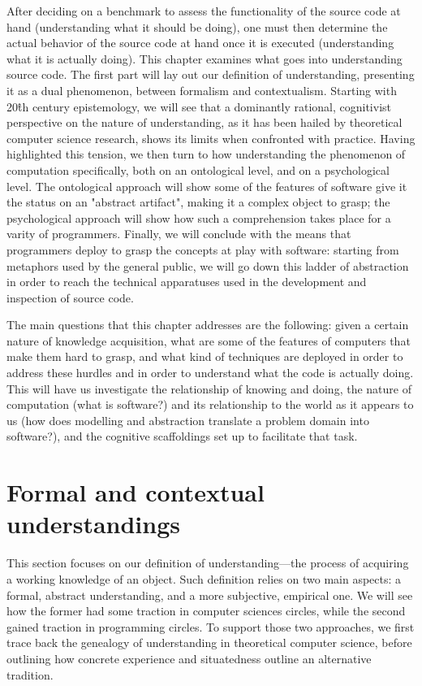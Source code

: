 After deciding on a benchmark to assess the functionality of the source code at hand (understanding what it should be doing), one must then determine the actual behavior of the source code at hand once it is executed (understanding what it is actually doing). This chapter examines what goes into understanding source code. The first part will lay out our definition of understanding, presenting it as a dual phenomenon, between formalism and contextualism. Starting with 20\^{th} century epistemology, we will see that a dominantly rational, cognitivist perspective on the nature of understanding, as it has been hailed by theoretical computer science research, shows its limits when confronted with practice. Having highlighted this tension, we then turn to how understanding the phenomenon of computation specifically, both on an ontological level, and on a psychological level. The ontological approach will show some of the features of software give it the status on an "abstract artifact", making it a complex object to grasp; the psychological approach will show how such a comprehension takes place for a varity of programmers. Finally, we will conclude with the means that programmers deploy to grasp the concepts at play with software: starting from metaphors used by the general public, we will go down this ladder of abstraction in order to reach the technical apparatuses used in the development and inspection of source code.

The main questions that this chapter addresses are the following: given a certain nature of knowledge acquisition, what are some of the features of computers that make them hard to grasp, and what kind of techniques are deployed in order to address these hurdles and in order to understand what the code is actually doing. This will have us investigate the relationship of knowing and doing, the nature of computation (what is software?) and its relationship to the world as it appears to us (how does modelling and abstraction translate a problem domain into software?), and the cognitive scaffoldings set up to facilitate that task.

\section{Formal and contextual understandings}
\label{sec:formal-contextual-understandings}

This section focuses on our definition of understanding—the process of acquiring a working knowledge of an object. Such definition relies on two main aspects: a formal, abstract understanding, and a more subjective, empirical one. We will see how the former had some traction in computer sciences circles, while the second gained traction in programming circles. To support those two approaches, we first trace back the genealogy of understanding in theoretical computer science, before outlining how concrete experience and situatedness outline an alternative tradition.

